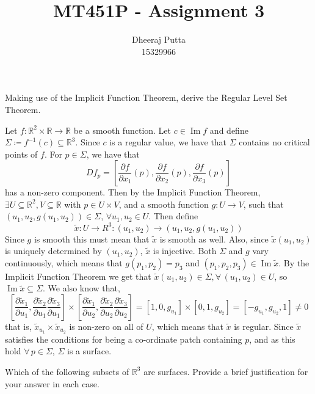\documentclass[12pt, answers]{exam}
\title{MT451P - Assignment 3}
\author{Dheeraj Putta \\ 15329966}
\date{}
\DeclareMathOperator{\im}{Im}
\begin{document}
    \maketitle
    \begin{questions}
        \thispagestyle{foot}

        \question Making use of the Implicit Function Theorem, derive the Regular Level Set Theorem.
        \begin{solution}
            Let $f : \mathbb{R}^2 \times \mathbb{R} \rightarrow \mathbb{R}$ be a smooth function. Let $c \in \im f$ and define
            $\Sigma \coloneqq f^{-1}(c) \subseteq \mathbb{R}^3$. Since $c$ is a regular value, we have that $\Sigma$ contains
            no critical points of $f$. For $p \in \Sigma$, we have that
            \[ Df_p = \left[\frac{\partial f}{\partial x_1}(p), \frac{\partial f}{\partial x_2}(p), \frac{\partial f}{\partial x_3}(p)\right] \]
            has a non-zero component. Then by the Implicit Function Theorem, $\exists U \subseteq \mathbb{R}^2, V \subseteq \mathbb{R}$
            with $p \in U \times V$, and a smooth function $g:U \rightarrow V$, such that $(u_1, u_2, g(u_1, u_2)) \in \Sigma$,
            $\forall u_1, u_2 \in U$. Then define
            \[ \tilde{x}: U \rightarrow R^3 :  (u_1, u_2) \to (u_1, u_2, g(u_1, u_2))\]
            Since $g$ is smooth this must mean that $\tilde{x}$ is smooth as well. Also, since $\tilde{x}(u_1, u_2)$ is
            uniquely determined by $(u_1, u_2)$, $\tilde{x}$ is injective. Both $\Sigma$ and $g$ vary continuously, which
            means that $g(p_1, p_2) = p_3$ and $(p_1, p_2, p_3) \in \im \tilde{x}$. By the Implicit Function Theorem we
            get that $\tilde{x}(u_1, u_2) \in \Sigma, \forall \, (u_1, u_2) \in U$, so $\im \tilde{x} \subseteq \Sigma$.
            We also know that,
            \[ \left[ \frac{\partial\tilde{x}_1}{\partial u_1}, \frac{\partial\tilde{x}_2}{\partial u_1}  \frac{\partial\tilde{x}_3}{\partial u_1}\right]
            \times \left[ \frac{\partial\tilde{x}_1}{\partial u_2}, \frac{\partial\tilde{x}_2}{\partial u_2}  \frac{\partial\tilde{x}_3}{\partial u_2}\right]
             = [1, 0, g_{u_1}] \times [0, 1, g_{u_2}] = [-g_{u_1}, g_{u_2}, 1] \neq 0\]
            that is, $\tilde{x}_{u_1} \times \tilde{x}_{u_2}$ is non-zero on all of $U$, which means that $\tilde{x}$ is
            regular. Since $\tilde{x}$ satisfies the conditions for being a co-ordinate patch containing $p$, and as this
            hold $\forall \, p \in \Sigma$, $\Sigma$ is a surface.
        \end{solution}
        \pagebreak
        \question Which of the following subsets of $\mathbb{R}^3$ are surfaces. Provide a brief justification for your answer in
        each case.


\end{questions}
\end{document}
